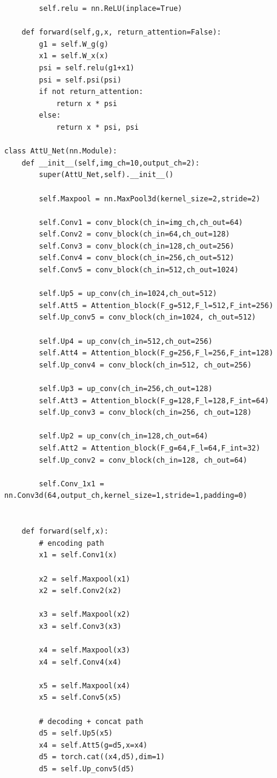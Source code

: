 \begin{verbatim}
        self.relu = nn.ReLU(inplace=True)
        
    def forward(self,g,x, return_attention=False):
        g1 = self.W_g(g)
        x1 = self.W_x(x)
        psi = self.relu(g1+x1)
        psi = self.psi(psi)
        if not return_attention:
            return x * psi
        else:
            return x * psi, psi

class AttU_Net(nn.Module):
    def __init__(self,img_ch=10,output_ch=2):
        super(AttU_Net,self).__init__()
        
        self.Maxpool = nn.MaxPool3d(kernel_size=2,stride=2)

        self.Conv1 = conv_block(ch_in=img_ch,ch_out=64)
        self.Conv2 = conv_block(ch_in=64,ch_out=128)
        self.Conv3 = conv_block(ch_in=128,ch_out=256)
        self.Conv4 = conv_block(ch_in=256,ch_out=512)
        self.Conv5 = conv_block(ch_in=512,ch_out=1024)

        self.Up5 = up_conv(ch_in=1024,ch_out=512)
        self.Att5 = Attention_block(F_g=512,F_l=512,F_int=256)
        self.Up_conv5 = conv_block(ch_in=1024, ch_out=512)

        self.Up4 = up_conv(ch_in=512,ch_out=256)
        self.Att4 = Attention_block(F_g=256,F_l=256,F_int=128)
        self.Up_conv4 = conv_block(ch_in=512, ch_out=256)
        
        self.Up3 = up_conv(ch_in=256,ch_out=128)
        self.Att3 = Attention_block(F_g=128,F_l=128,F_int=64)
        self.Up_conv3 = conv_block(ch_in=256, ch_out=128)
        
        self.Up2 = up_conv(ch_in=128,ch_out=64)
        self.Att2 = Attention_block(F_g=64,F_l=64,F_int=32)
        self.Up_conv2 = conv_block(ch_in=128, ch_out=64)

        self.Conv_1x1 = nn.Conv3d(64,output_ch,kernel_size=1,stride=1,padding=0)


    def forward(self,x):
        # encoding path
        x1 = self.Conv1(x)

        x2 = self.Maxpool(x1)
        x2 = self.Conv2(x2)
        
        x3 = self.Maxpool(x2)
        x3 = self.Conv3(x3)

        x4 = self.Maxpool(x3)
        x4 = self.Conv4(x4)

        x5 = self.Maxpool(x4)
        x5 = self.Conv5(x5)

        # decoding + concat path
        d5 = self.Up5(x5)
        x4 = self.Att5(g=d5,x=x4)
        d5 = torch.cat((x4,d5),dim=1)        
        d5 = self.Up_conv5(d5)
        

\end{verbatim}
